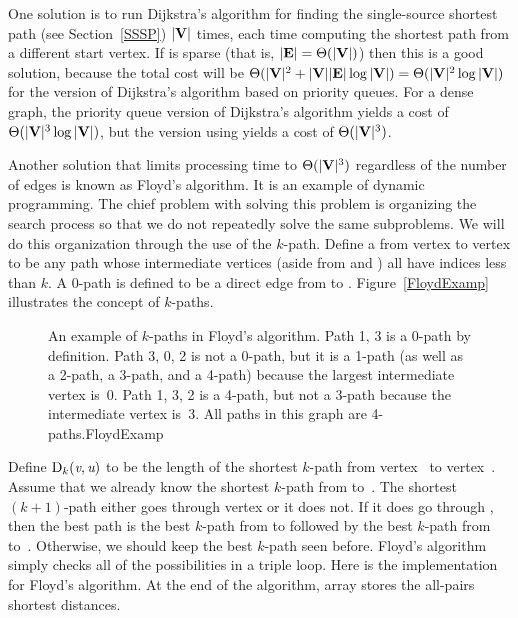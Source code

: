 One solution is to run Dijkstra's 
algorithm
for finding the single-source shortest path 
(see Section~\ref{SSSP})
$|{\textbf{V}}|$ times, each
time computing the shortest path from a different start vertex.
If  is sparse (that is, $|{\textbf{E}}| = \Theta(|{\textbf{V}}|)$)
then this is a good solution, because the total cost will be
$\Theta(|{\textbf{V}}|^2 + |{\textbf{V}}||{\textbf{E}}| \log |{\textbf{V}}|)
= \Theta(|{\textbf{V}}|^2 \log |{\textbf{V}}|)$
for the version of Dijkstra's algorithm based on priority queues.
For a dense graph, the priority queue version of Dijkstra's algorithm
yields a cost of $\Theta(|{\textbf{V}}|^3 \log |{\textbf{V}}|)$, but the
version using  yields a cost
of $\Theta(|{\textbf{V}}|^3)$.

Another solution that limits processing time to $\Theta(|{\textbf{V}}|^3)$
regardless of the number of edges is known as Floyd's algorithm.
It is an example of dynamic programming.
The chief problem with solving this problem is organizing the search
process so that we do not repeatedly solve the same subproblems.
We will do this organization through the use of the $k$-path.
Define a  from vertex  to vertex
 to be any path whose intermediate vertices (aside from
 and ) all have indices less than $k$.
A 0-path is defined to be a direct edge from  to .
Figure~\ref{FloydExamp} illustrates the concept of $k$-paths.

\begin{figure}
\vspace{1pt}
{An example of $k$-paths in Floyd's algorithm.
Path 1, 3 is a 0-path by definition.
Path 3, 0, 2 is not a 0-path, but it is a 1-path (as well as a 2-path,
a 3-path, and a 4-path) because the largest intermediate vertex is~0.
Path 1, 3, 2 is a 4-path, but not a 3-path because the intermediate
vertex is~3.
All paths in this graph are 4-paths.}{FloydExamp}
\bigskip
\end{figure}

Define ${\rm D}_k({\textit{v}}, {\textit{u}})$ to be the length of the shortest
$k$-path from vertex~ to vertex~. 
Assume that we already know the shortest $k$-path from 
to~.
The shortest $(k+1)$-path either goes through vertex  or it
does not.
If it does go through , then the best path is
the best $k$-path from  to  followed by the best
$k$-path from  to~.
Otherwise, we should keep the best $k$-path seen before.
Floyd's algorithm simply checks all of the possibilities in a triple
loop.
Here is the implementation for Floyd's algorithm.
At the end of the algorithm, array  stores the all-pairs shortest
distances.

